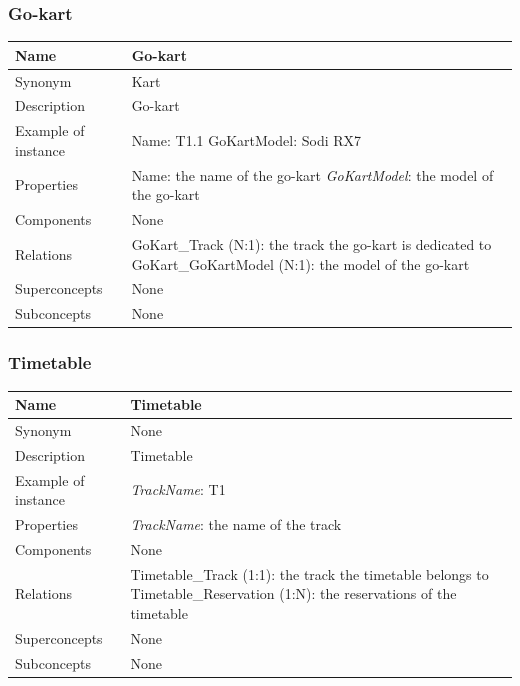 \documentclass{beamer}
\begin{document}
\begin{frame}
\frametitle{Go-kart}
\begin{table}
\tiny
\begin{tabular}{|p{2cm}|p{6cm}|}
\hline
Name & \textbf{Go-kart} \\
\hline
Synonym & Kart \\
\hline
Description & Go-kart \\
\hline
Example of instance &
Name: T1.1 \newline
GoKartModel: Sodi RX7 \\
\hline
Properties &
Name: the name of the go-kart \newline
\textit{GoKartModel}: the model of the go-kart \\
\hline
Components & None \\
\hline
Relations &
GoKart\_Track (N:1): the track the go-kart is dedicated to \newline
GoKart\_GoKartModel (N:1): the model of the go-kart \\
\hline
Superconcepts & None \\
\hline
Subconcepts & None \\
\hline
\end{tabular}
\end{table}
\end{frame}

\begin{frame}
\frametitle{Timetable}
\begin{table}
\tiny
\begin{tabular}{|p{2cm}|p{6cm}|}
\hline
Name & \textbf{Timetable} \\
\hline
Synonym & None \\
\hline
Description & Timetable \\
\hline
Example of instance &
\textit{TrackName}: T1 \\
\hline
Properties &
\textit{TrackName}: the name of the track \\
\hline
Components & None \\
\hline
Relations &
Timetable\_Track (1:1): the track the timetable belongs to \newline
Timetable\_Reservation (1:N): the reservations of the timetable \\
\hline
Superconcepts & None \\
\hline
Subconcepts & None \\
\hline
\end{tabular}
\end{table}
\end{frame}
\end{document}
